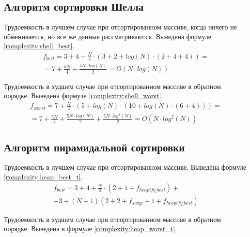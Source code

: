 \subsection{Алгоритм сортировки Шелла}

Трудоемкость в лучшем случае при отсортированном массиве, когда ничего не обменивается, но все же данные рассматриваются. Выведена \newline формуле \ref{сomplexity:shell_best}.
\begin{equation}
	\label{сomplexity:shell_best}
	\begin{aligned}
		f_{best} = 3 + 4 + \frac{N}{4} \cdot (3 + 2 + log(N) \cdot (2 + 4 + 4)) = \\
		= 7 + \frac{5N}{4} + \frac{5N \cdot log(N)}{2} = O(N \cdot log(N))
	\end{aligned}
\end{equation}

Трудоемкость в худшем случае при отсортированном массиве в обратном порядке. Выведена формуле \ref{сomplexity:shell_worst}.
\begin{equation}
	\label{сomplexity:shell_worst}
	\begin{aligned}
		f_{worst} = 7 + \frac{N}{4} \cdot (5 + log(N) \cdot (10 + log(N) \cdot (6 + 4))) =\\
		= 7 + \frac{5N}{4} + \frac{5N \cdot log(N)}{2} + \frac{5N \cdot log^2(N)}{2} = O(N \cdot log^2(N))
	\end{aligned}
\end{equation}

\clearpage

\subsection{Алгоритм пирамидальной сортировки}

Трудоемкость в лучшем случае при отсортированном массиве. Выведена формуле \ref{сomplexity:heap_best_t}.
\begin{equation}
	\label{сomplexity:heap_best_t}
	\begin{aligned}
		f_{best} = 3 + 4 + \frac{N}{2} \cdot (2 + 1 + f_{heapify\_best}) + \\
		+ 3 + (N - 1)(2 + 2 + f_{swap} + 1 + f_{heapify\_best})
	\end{aligned}
\end{equation}

Трудоемкость в худшем случае при отсортированном массиве в обратном порядке. Выведена в формуле \ref{сomplexity:heap_worst_t}.

